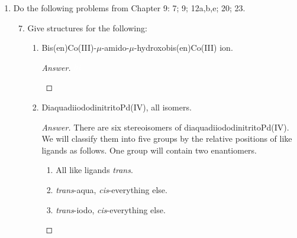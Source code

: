\documentclass[../psets.tex]{subfiles}
\begin{document}
\begin{enumerate}[label={\Roman*)}]
    \item {}Do the following problems from Chapter 9: 7; 9; 12a,b,e; 20; 23.
    \begin{enumerate}[label={\textbf{9.\arabic*}}]
        \setcounter{enumii}{6}
        \item Give structures for the following:
        \begin{enumerate}[label={\textbf{\alph*.}}]
            \item Bis(en)Co(III)-$\mu$-amido-$\mu$-hydroxobis(en)Co(III) ion.
            \begin{proof}[Answer]
                ${\color{white}hi}$
                \begin{center}
                    \chemleft{[}
                    \chemright{]^{4+}}
                \end{center}
            \end{proof}
            \item DiaquadiiododinitritoPd(IV), all isomers.
            \begin{proof}[Answer]
                There are six stereoisomers of diaquadiiododinitritoPd(IV). We will classify them into five groups by the relative positions of like ligands as follows. One group will contain two enantiomers.
                \begin{enumerate}[label={\arabic*.}]
                    \item All like ligands \emph{trans}.
                    \begin{center}
                    \end{center}
                    \item \emph{trans}-aqua, \emph{cis}-everything else.
                    \begin{center}
                    \end{center}
                    \item \emph{trans}-iodo, \emph{cis}-everything else.

\end{enumerate}
\end{proof}
\end{enumerate}
\end{enumerate}
\end{enumerate}
\end{document}

